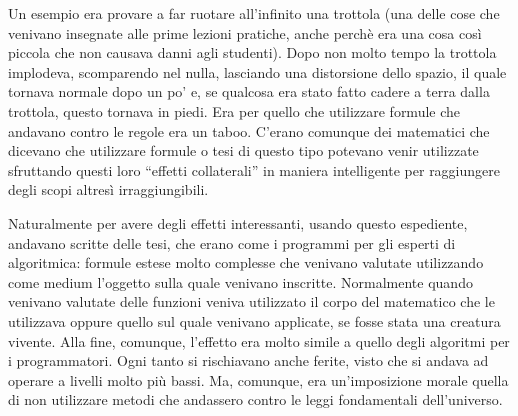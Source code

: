     Un esempio era provare a far
    ruotare all'infinito una trottola (una delle cose che venivano
    insegnate alle prime lezioni pratiche, anche perchè era una cosa così
    piccola che non causava danni agli studenti). Dopo non molto tempo la
    trottola implodeva, scomparendo nel nulla, lasciando una distorsione
    dello spazio, il quale tornava normale dopo un po' e, se qualcosa era
    stato fatto cadere a terra dalla trottola, questo tornava in piedi. Era
    per quello che utilizzare formule che andavano contro le regole era un
    taboo. C'erano comunque dei matematici che dicevano che utilizzare
    formule o tesi di questo tipo potevano venir utilizzate sfruttando
    questi loro ``effetti collaterali'' in maniera intelligente per
    raggiungere degli scopi altresì irraggiungibili.
    
    Naturalmente per avere degli effetti interessanti, usando questo
    espediente, andavano scritte
    delle tesi, che erano come i programmi per gli esperti di algoritmica:
    formule estese molto complesse che venivano valutate utilizzando
    come medium l'oggetto sulla quale venivano inscritte. Normalmente
    quando venivano valutate delle funzioni veniva utilizzato il corpo
    del matematico che le utilizzava oppure quello sul quale venivano
    applicate, se fosse stata una creatura vivente. Alla fine, comunque, l'effetto era
    molto simile a quello degli algoritmi per i programmatori. Ogni tanto
    si rischiavano anche ferite, visto che si andava ad operare a livelli
    molto più bassi. Ma, comunque, era
    un'imposizione morale quella di non utilizzare metodi che andassero
    contro le leggi fondamentali dell'universo. 

